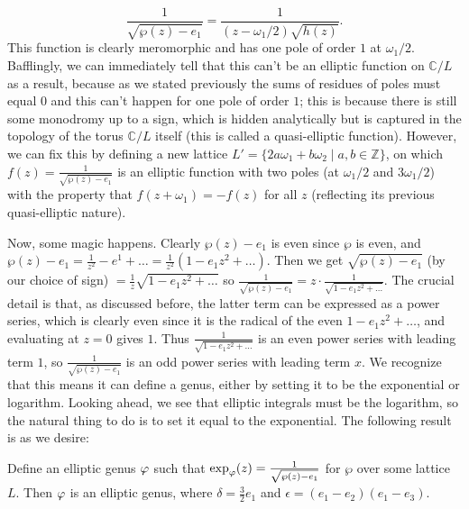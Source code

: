 \[\frac{1}{\sqrt{\wp(z) - e_1}} = \frac{1}{(z - \omega_1 / 2) \sqrt{h(z)}}.\]
This function is clearly meromorphic and has one pole of order $1$ at $\omega_1/2$. Bafflingly, we can immediately tell that this can't be an elliptic function on $\mathbb{C}/L$ as a result, because as we stated previously the sums of residues of poles must equal $0$ and this can't happen for one pole of order $1$; this is because there is still some monodromy up to a sign, which is hidden analytically but is captured in the topology of the torus $\mathbb{C} / L$ itself (this is called a quasi-elliptic function). However, we can fix this by defining a new lattice $L' = \{2a \omega_1 +  b \omega_2 \mid a, b \in \mathbb{Z} \}$, on which $f(z) = \frac{1}{\sqrt{\wp(z) - e_1}}$ is an elliptic function with two poles (at $\omega_1/2$ and $3\omega_1/2$) with the property that $f(z + \omega_1) = -f(z)$ for all $z$ (reflecting its previous quasi-elliptic nature). 

Now, some magic happens. Clearly $\wp(z) - e_1$ is even since $\wp$ is even, and $\wp(z) - e_1 = \frac{1}{z^2} - e^1 + \dots = \frac{1}{z^2} (1 - e_1 z^2 + \dots)$. Then we get $\sqrt{\wp(z) - e_1}$ (by our choice of sign) $= \frac{1}{z} \sqrt{1 - e_1 z^2 + \dots}$ so $\frac{1}{\sqrt{\wp(z) - e_1}} = z \cdot \frac{1}{\sqrt{1 - e_1 z^2 + \dots}}$.  The crucial detail is that, as discussed before, the latter term can be expressed as a power series, which is clearly even since it is the radical of the even $1 - e_1 z^2 + \dots$, and evaluating at $z = 0$ gives $1$. Thus $\frac{1}{\sqrt{1 - e_1 z^2 + \dots}}$ is an even power series with leading term $1$, so  $\frac{1}{\sqrt{\wp(z) - e_1}}$ is an odd power series with leading term $x$. We recognize that this means it can define a genus, either by setting it to be the exponential or logarithm. Looking ahead, we see that elliptic integrals must be the logarithm, so the natural thing to do is to set it equal to the exponential. The following result is as we desire:

\begin{theorem}
    Define an elliptic genus $\varphi$ such that $\exp_\varphi(z) = \frac{1}{\sqrt{\wp(z) - e_1}} $ for $\wp$ over some lattice $L$. Then $\varphi$ is an elliptic genus, where $\delta = \frac{3}{2} e_1$ and $\epsilon = (e_1 - e_2) (e_1 - e_3)$.
\end{theorem}

